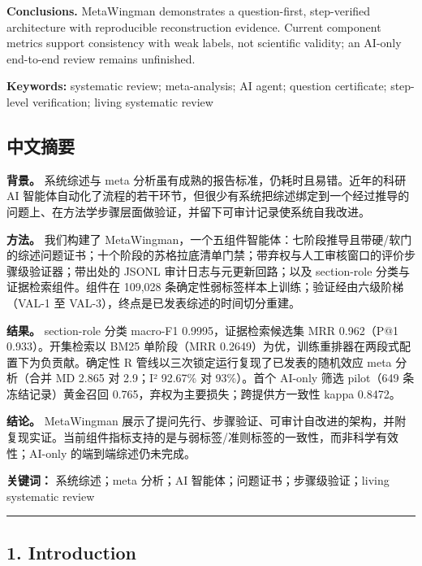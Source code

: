 \documentclass[
]{article}
\begin{document}
\textbf{Conclusions.} MetaWingman demonstrates a question-first,
step-verified architecture with reproducible reconstruction evidence.
Current component metrics support consistency with weak labels, not
scientific validity; an AI-only end-to-end review remains unfinished.

\textbf{Keywords:} systematic review; meta-analysis; AI agent; question
certificate; step-level verification; living systematic review

\subsection{中文摘要}\label{ux4e2dux6587ux6458ux8981}

\textbf{背景。} 系统综述与 meta
分析虽有成熟的报告标准，仍耗时且易错。近年的科研 AI
智能体自动化了流程的若干环节，但很少有系统把综述绑定到一个经过推导的问题上、在方法学步骤层面做验证，并留下可审计记录使系统自我改进。

\textbf{方法。} 我们构建了
MetaWingman，一个五组件智能体：七阶段推导且带硬/软门的综述问题证书；十个阶段的苏格拉底清单门禁；带弃权与人工审核窗口的评价步骤级验证器；带出处的
JSONL 审计日志与元更新回路；以及 section-role 分类与证据检索组件。组件在
109,028 条确定性弱标签样本上训练；验证经由六级阶梯（VAL-1 至
VAL-3），终点是已发表综述的时间切分重建。

\textbf{结果。} section-role 分类 macro-F1 0.9995，证据检索候选集 MRR
0.962（P@1 0.933）。开集检索以 BM25 单阶段（MRR
0.2649）为优，训练重排器在两段式配置下为负贡献。确定性 R
管线以三次锁定运行复现了已发表的随机效应 meta 分析（合并 MD 2.865 对
2.9；I² 92.67\% 对 93\%）。首个 AI-only 筛选 pilot（649
条冻结记录）黄金召回 0.765，弃权为主要损失；跨提供方一致性 kappa
0.8472。

\textbf{结论。} MetaWingman
展示了提问先行、步骤验证、可审计自改进的架构，并附复现实证。当前组件指标支持的是与弱标签/准则标签的一致性，而非科学有效性；AI-only
的端到端综述仍未完成。

\textbf{关键词：} 系统综述；meta 分析；AI
智能体；问题证书；步骤级验证；living systematic review

\begin{center}\rule{0.5\linewidth}{0.5pt}\end{center}

\subsection{1. Introduction}\label{introduction}
\end{document}
